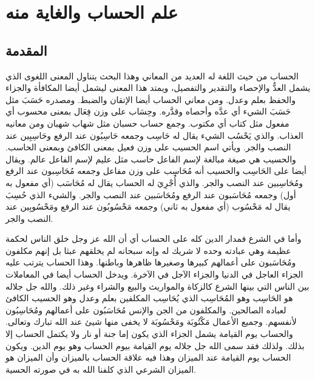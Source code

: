 \chapter{علم الحساب والغاية منه}

\section{المقدمة}

الحساب من حيث اللغة له العديد من المعاني وهذا البحث يتناول المعنى اللغوى الذي يشمل العدُّ والإحصاء والتقدير والتفصيل، ويمتد هذا المعنى ليشمل أيضا المكافأة والجزاء والحفظ بعلم وعدل. ومن معاني الحساب أيضا الإتقان والضبط. ومصدره حَسَبَ مثل حَسَبَ الشيء أي عدَّه وأحصاه وقدَّره. وحِسَاب على وزن فِعَال بمعنى محسوب أي مفعول مثل كتاب أي مكتوب. وجمع حساب حسبان مثل شهاب شهبان ومن معانيه العذاب. والذي يَحْسُب الشيء يقال له حَاسِب وجمعه حَاسِبُون عند الرفع وحَاسِبِين عند النصب والجر. ويأتي اسم الحسيب  على وزن فعيل بمعنى الكافئ وبمعنى الحاسب. والحسيب هي صيغة مبالغة لإسم الفاعل حاسب مثل عليم لإسم الفاعل عالم. ويقال أيضا على الحَاسِب والحسيب أنه مُحَاسِب على وزن مفاعل وجمعه مُحَاسِبون عند الرفع ومُحَاسِبين عند النصب والجر. والذي أُجْرِيَ له الحساب يقال له مُحَاسَب (أي مفعول به أول) وجمعه مُحَاسَبون عند الرفع ومُحَاسَبين عند النصب والجر. والشيء الذي حُسِبَ يقال له مَحْسُوب (أي مفعول به ثاني) وجمعه مَحْسُوبُون عند الرفع ومَحْسُوبِين عند النصب والجر. 

وأما في الشرع فمدار الدين كله على الحساب أي أن الله عز وجل خلق الناس لحكمة عظيمة وهي عبادته وحده لا شريك له وإنه سبحانه لم يخلقهم عبثا بل إنهم مكلفون ومُحَاسَبون على أعمالهم كبيرها وصغيرها ظاهرها وباطنها. وهذا الحساب يترتب عليه الجزاء العاجل في الدنيا والجزاء الآجل في الآخرة. ويدخل الحساب أيضا في المعاملات بين الناس التي بينها الشرع كالزكاة والمواريث والبيع والشراء وغير ذلك. والله جل جلاله هو الحَاسِب وهو المُحَاسِب الذي يُحَاسِب المكلفين بعلم وعدل وهو الحسيب الكافئ لعباده الصالحين. والمكلفون من الجن والإنس مُحَاسَبُون على أعمالهم ومُحَاسِبُون لأنفسهم. وجميع الأعمال مَكْتُوبَة ومَحْسُوبَة لا يخفى منها شيئ عند الله تبارك وتعالى. والحساب يوم القيامة يشمل الجزاء الذي يكون إما جنة أو نار ولا يكتمل الحساب إلا بذلك. ولذلك فقد سمى الله جل جلاله يوم القيامة بيوم الحساب وهو يوم الدين. ويكون الحساب يوم القيامة عند الميزان وهذا فيه علاقة الحساب بالميزان وأن الميزان هو الميزان الشرعي الذي كلفنا الله به في صورته الحسية. 

